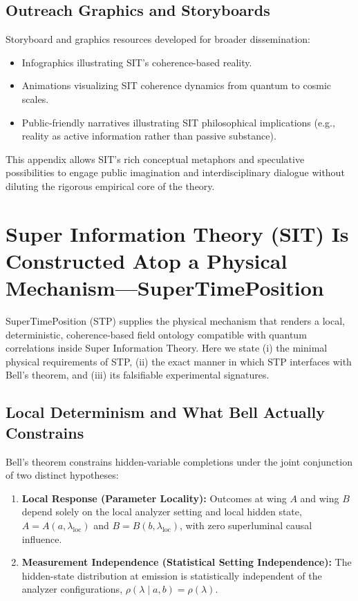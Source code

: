 \subsection{Outreach Graphics and Storyboards}

Storyboard and graphics resources developed for broader dissemination:

\begin{itemize}
    \item Infographics illustrating SIT's coherence-based reality.
    \item Animations visualizing SIT coherence dynamics from quantum to cosmic scales.
    \item Public-friendly narratives illustrating SIT philosophical implications (e.g., reality as active information rather than passive substance).
\end{itemize}

This appendix allows SIT's rich conceptual metaphors and speculative possibilities to engage public imagination and interdisciplinary dialogue without diluting the rigorous empirical core of the theory.



\section{Super Information Theory (SIT) Is Constructed Atop a Physical Mechanism---SuperTimePosition}
\label{app:stp-bell-mechanism}

SuperTimePosition (STP) supplies the physical mechanism that renders a local, deterministic, coherence-based field ontology compatible with quantum correlations inside Super Information Theory. Here we state (i) the minimal physical requirements of STP, (ii) the exact manner in which STP interfaces with Bell's theorem, and (iii) its falsifiable experimental signatures.

\subsection{Local Determinism and What Bell Actually Constrains}

Bell's theorem constrains hidden-variable completions under the joint conjunction of two distinct hypotheses:
\begin{enumerate}[leftmargin=2em]
  \item \textbf{Local Response (Parameter Locality):} Outcomes at wing $A$ and wing $B$ depend solely on the local analyzer setting and local hidden state, $A = A(a, \lambda_{\mathrm{loc}})$ and $B = B(b, \lambda_{\mathrm{loc}})$, with zero superluminal causal influence.
  \item \textbf{Measurement Independence (Statistical Setting Independence):} The hidden-state distribution at emission is statistically independent of the analyzer configurations, $\rho(\lambda \mid a, b) = \rho(\lambda)$.
\end{enumerate}

